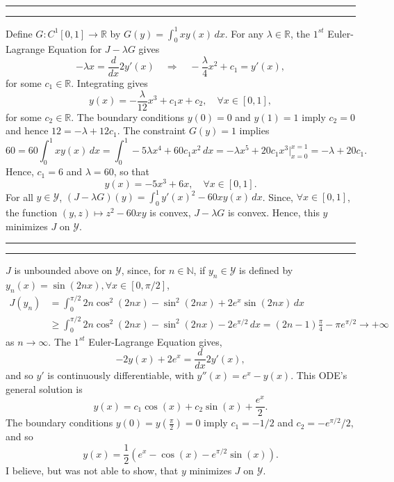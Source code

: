 \documentclass[11pt]{article}
\newcounter{questionCounter}
\newcounter{partCounter}[questionCounter]
\newenvironment{question}[2][\arabic{questionCounter}]{%
    \setcounter{partCounter}{0}%
    \vspace{.25in} \hrule \vspace{0.5em}%
        \noindent{\bf #2}%
    \vspace{0.8em} \hrule \vspace{.10in}%
    \addtocounter{questionCounter}{1}%
}{}
\newcommand{\N}{\mathbb{N}}             %
\newcommand{\R}{\mathbb{R}}             %
\newcommand{\Y}{\mathscr{Y}}            %
\begin{document}
\begin{question}{Problem 3}
Define $G : C^1[0,1] \to \R$ by $G(y) = \int_0^1 xy(x) \, dx$. For any
$\lambda \in \R$, the $1^{st}$ Euler-Lagrange Equation for $J - \lambda G$
gives
\[-\lambda x = \frac{d}{dx} 2y'(x)
    \quad \Rightarrow \quad
  -\frac{\lambda}{4}x^2 + c_1 = y'(x),
\]
for some $c_1 \in \R$. Integrating gives
\[y(x) = -\frac{\lambda}{12}x^3 + c_1x + c_2, \quad \forall x \in [0,1],\]
for some $c_2 \in \R$.
The boundary conditions $y(0) = 0$ and $y(1) = 1$ imply $c_2 = 0$ and hence
$12 = -\lambda + 12c_1$. The constraint $G(y) = 1$ implies
\[60
    = 60\int_0^1 xy(x) \, dx
    = \int_0^1 -5\lambda x^4 + 60c_1x^2 \, dx
    = -\lambda x^5 + 20c_1x^3 \bigg|_{x = 0}^{x = 1}
    = -\lambda + 20c_1.
\]
Hence, $c_1 = 6$ and $\lambda = 60$, so that
\[y(x) = - 5x^3 + 6x, \quad \forall x \in [0,1].\]
For all $y \in \Y$, $(J - \lambda G)(y) = \int_0^1 y'(x)^2 - 60xy(x) \, dx$.
Since, $\forall x \in [0,1]$, the function $(y,z) \mapsto z^2 - 60xy$ is
convex, $J - \lambda G$ is convex. Hence, this $y$ minimizes $J$ on $\Y$.
\end{question}

\begin{question}{Problem 4}
$J$ is unbounded above on $\Y$, since, for $n \in \N$, if
$y_n \in \Y$ is defined by $y_n(x) = \sin(2nx), \forall x \in [0,\pi/2]$,
\vspace{-5mm}
\begin{align*}
J(y_n)
 &  = \int_0^{\pi/2} 2n \cos^2(2nx) - \sin^2(2nx) + 2e^x\sin(2nx) \, dx \\
 &  \geq \int_0^{\pi/2} 2n \cos^2(2nx) - \sin^2(2nx) - 2e^{\pi/2} \, dx
    =  (2n - 1)\frac{\pi}{4} - \pi e^{\pi/2}
    \to +\infty
\end{align*}
as $n \to \infty$. The $1^{st}$ Euler-Lagrange Equation gives,
\vspace{-2mm}
\[-2y(x) + 2e^x = \frac{d}{dx} 2y'(x),\]
and so $y'$ is continuously differentiable, with $y''(x) = e^x - y(x)$. This
ODE's general solution is
\[y(x) = c_1\cos(x) + c_2\sin(x) + \frac{e^x}{2}.\]
The boundary conditions $y(0) = y\left( \frac{\pi}{2} \right) = 0$ imply
$c_1 = -1/2$ and $c_2 = -e^{\pi/2}/2$, and so
\vspace{-2mm}
\[y(x) = \frac{1}{2} \left( e^x - \cos(x) - e^{\pi/2}\sin(x) \right).\]
I believe, but was not able to show, that $y$ minimizes $J$ on $\Y$.
\end{question}
\end{document}
